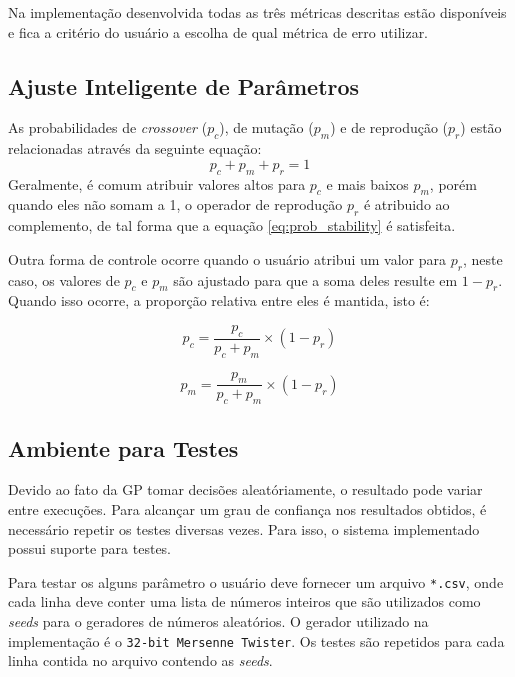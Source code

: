 \documentclass[a4paper]{article}
\begin{document}
Na implementação desenvolvida todas as três métricas descritas estão disponíveis
e fica a critério do usuário a escolha de qual métrica de erro utilizar.

\subsection{Ajuste Inteligente de Parâmetros}\label{subsec:smart_par}

As probabilidades de \textit{crossover} ($p_c$), de mutação ($p_m$) e de
reprodução ($p_r$) estão relacionadas através da seguinte equação:
\begin{equation} \label{eq:prob_stability}
  p_c + p_m + p_r = 1
\end{equation}
Geralmente, é comum atribuir valores altos para $p_c$ e mais baixos $p_m$, porém
quando eles não somam a 1, o operador de reprodução $p_r$ é atribuido ao
complemento, de tal forma que a equação \ref{eq:prob_stability} é satisfeita.

Outra forma de controle ocorre quando o usuário atribui um valor para $p_r$,
neste caso, os valores de $p_c$ e $p_m$ são ajustado para que a soma deles
resulte em $1-p_r$. Quando isso ocorre, a proporção relativa entre eles é
mantida, isto é:

\noindent\begin{minipage}{.5\linewidth}
  \begin{equation*}
    p_c = \frac{p_c}{p_c+p_m}\times (1-p_r)  
  \end{equation*}
\end{minipage}
\begin{minipage}{.5\linewidth}
  \begin{equation*}
    p_m = \frac{p_m}{p_c+p_m}\times (1-p_r)  
  \end{equation*}
\end{minipage}

\subsection{Ambiente para Testes}

Devido ao fato da GP tomar decisões aleatóriamente, o resultado pode variar
entre execuções. Para alcançar um grau de confiança nos resultados obtidos, é
necessário repetir os testes diversas vezes. Para isso, o sistema implementado
possui suporte para testes.

Para testar os alguns parâmetro o usuário deve fornecer um arquivo
\texttt{*.csv}, onde cada linha deve conter uma lista de números inteiros que
são utilizados como \textit{seeds} para o geradores de números aleatórios. O
gerador utilizado na implementação é o \texttt{32-bit Mersenne Twister}. Os
testes são repetidos para cada linha contida no arquivo contendo as
\textit{seeds}.
\end{document}
